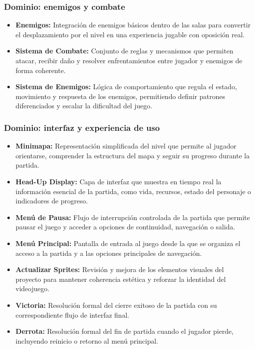 \subsubsection{Dominio: enemigos y combate}
\begin{itemize}
    \item \textbf{Enemigos:} Integración de enemigos básicos dentro de las salas para
    convertir el desplazamiento por el nivel en una experiencia jugable con oposición real.
    \item \textbf{Sistema de Combate:} Conjunto de reglas y mecanismos que permiten atacar,
    recibir daño y resolver enfrentamientos entre jugador y enemigos de forma coherente.
    \item \textbf{Sistema de Enemigos:} Lógica de comportamiento que regula el estado,
    movimiento y respuesta de los enemigos, permitiendo definir patrones diferenciados y
    escalar la dificultad del juego.
\end{itemize}

\subsubsection{Dominio: interfaz y experiencia de uso}
\begin{itemize}
    \item \textbf{Minimapa:} Representación simplificada del nivel que permite al jugador
    orientarse, comprender la estructura del mapa y seguir su progreso durante la partida.
    \item \textbf{Head-Up Display:} Capa de interfaz que muestra en tiempo real la
    información esencial de la partida, como vida, recursos, estado del personaje o
    indicadores de progreso.
    \item \textbf{Menú de Pausa:} Flujo de interrupción controlada de la partida que permite
    pausar el juego y acceder a opciones de continuidad, navegación o salida.
    \item \textbf{Menú Principal:} Pantalla de entrada al juego desde la que se organiza el
    acceso a la partida y a las opciones principales de navegación.
    \item \textbf{Actualizar Sprites:} Revisión y mejora de los elementos visuales del
    proyecto para mantener coherencia estética y reforzar la identidad del videojuego.
    \item \textbf{Victoria:} Resolución formal del cierre exitoso de la partida con su
    correspondiente flujo de interfaz final.
    \item \textbf{Derrota:} Resolución formal del fin de partida cuando el jugador pierde,
    incluyendo reinicio o retorno al menú principal.
\end{itemize}


